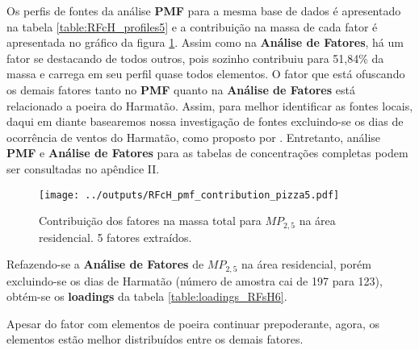 Os perfis de fontes da análise \textbf{PMF} para a mesma base de dados é 
apresentado na tabela \ref{table:RFcH_profiles5} e a contribuição na massa
de cada fator é apresentada no gráfico da figura \ref{table:RFcH_contribution5}.
Assim como na \textbf{Análise de Fatores}, há um fator se destacando de todos
outros, pois sozinho contribuiu para 51,84\% da massa e carrega em seu perfil
quase todos elementos. O fator que está ofuscando os demais fatores
tanto no \textbf{PMF} quanto na \textbf{Análise de Fatores} está relacionado
a poeira do Harmatão. 
Assim, para melhor identificar as fontes locais, daqui em diante basearemos 
nossa investigação de fontes excluindo-se os dias de ocorrência de ventos do 
Harmatão, como proposto por \cite{aboh2009}. Entretanto, análise \textbf{PMF} e 
\textbf{Análise de Fatores} para as tabelas de concentrações completas podem
ser consultadas no apêndice II. 

\begin{figure}[H]
\centering
  \texttt{[image: ../outputs/RFcH\_pmf\_contribution\_pizza5.pdf]}
  \caption{Contribuição dos fatores na massa total para $MP_{2,5}$ na área
           residencial. 5 fatores extraídos.
          \label{table:RFcH_contribution5}}
\end{figure}

\begin{table}[H]
  \centering
    
    \caption{Perfis do fatores na área residencial $MP_{2,5}$ 
             (seed=123, n= 197). 
             \label{table:RFcH_profiles5}}
\end{table}



Refazendo-se a \textbf{Análise de Fatores} de $MP_{2,5}$ na área residencial, 
porém excluindo-se os dias de Harmatão (número de amostra cai de 197 para 123), 
obtém-se os \textbf{loadings} da tabela \ref{table:loadings_RFsH6}. 

\begin{table}[H]
  
  \caption{Análise de Fatores para $MP_{2,5}$ na região residencial
           excluindo-se dias de ocorrência do Harmatão.
           Rotação varimax - 5 fatores retidos (n=123).
           (\textcolor{red}{h} : Comunalidade; 
           \textcolor{red}{S=1-h} : Singularidade; 
           \textcolor{red}{C} : Complexidade.)
           \label{table:loadings_RFsH5}}
\end{table}

Apesar do fator com elementos de poeira continuar prepoderante, agora, os 
elementos estão melhor distribuídos entre os demais fatores.  

